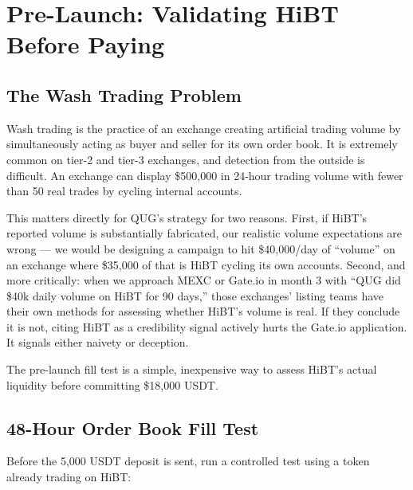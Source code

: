 \documentclass[11pt,a4paper]{article}
\begin{document}
\section{Pre-Launch: Validating HiBT Before Paying}
\label{sec:washtrade}

\subsection{The Wash Trading Problem}

Wash trading is the practice of an exchange creating artificial trading volume by simultaneously acting as buyer and seller for its own order book. It is extremely common on tier-2 and tier-3 exchanges, and detection from the outside is difficult. An exchange can display \$500,000 in 24-hour trading volume with fewer than 50 real trades by cycling internal accounts.

This matters directly for QUG's strategy for two reasons. First, if HiBT's reported volume is substantially fabricated, our realistic volume expectations are wrong — we would be designing a campaign to hit \$40,000/day of ``volume'' on an exchange where \$35,000 of that is HiBT cycling its own accounts. Second, and more critically: when we approach MEXC or Gate.io in month 3 with ``QUG did \$40k daily volume on HiBT for 90 days,'' those exchanges' listing teams have their own methods for assessing whether HiBT's volume is real. If they conclude it is not, citing HiBT as a credibility signal actively hurts the Gate.io application. It signals either naivety or deception.

The pre-launch fill test is a simple, inexpensive way to assess HiBT's actual liquidity before committing \$18,000 USDT.

\subsection{48-Hour Order Book Fill Test}

Before the 5,000 USDT deposit is sent, run a controlled test using a token already trading on HiBT:
\end{document}
